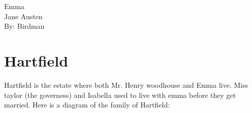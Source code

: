 \documentclass[12pt, a4paper]{article}
\begin{document}
\begin{center}
{\fonthead
\huge{Emma}\\[0.2cm]
\Large{Jane Austen}\\[0.5cm]
\large{By: Birdman}\\[1cm]
}
\end{center}
\fontpar

\section*{Hartfield}

Hartfield is the estate where both Mr. Henry woodhouse and Emma live.
Miss taylor (the governess) and Isabella used to live with emma before 
they get married. Here is a diagram of the family of Hartfield:

\begin{otherlanguage}{arabic}

\end{otherlanguage}
\end{document}
